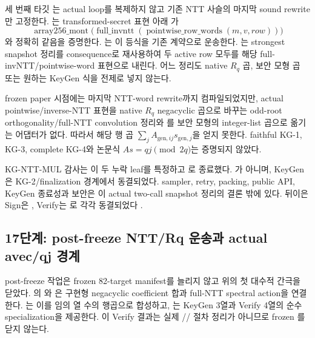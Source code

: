 세 번째 타깃 는 actual loop를 복제하지
않고 기존 NTT 사슬의 마지막 sound rewrite만 고정한다.
는 transformed-secret 표현 아래
가
\[
  \operatorname{array256\_mont}
  \bigl(\operatorname{full\_invntt}
    (\operatorname{pointwise\_row\_words}(m,v,row))\bigr)
\]
와 정확히 같음을 증명한다.
는 이 등식을 기존
 계약으로 운송한다.
는 strongest snapshot
정리를 consequence로 재사용하여 두 active row 모두를 해당
full-invNTT/pointwise-word 표현으로 내린다. 어느 정리도 native \(R_q\) 곱,
보안 모형 곱 또는 원하는 KeyGen 식을 전제로 넣지 않는다.

\begin{openobligation}
frozen paper 시점에는 마지막 NTT-word rewrite까지 컴파일되었지만, actual pointwise/inverse-NTT
표현을 native \(R_q\) negacyclic 곱으로 바꾸는 odd-root orthogonality/full-NTT
convolution 정리와 를 보안 모형의 integer-list 곱으로 옮기는
어댑터가 없다. 따라서 해당 행 곱
\(\sum_j A_{\mathrm{gen},ij}s_{\mathrm{gen},j}\)을 얻지 못한다. faithful KG-1,
KG-3, complete KG-4와 논문식 \(A s=qj\pmod{2q}\)는 증명되지 않았다.
\end{openobligation}

KG-NTT-MUL 감사는 이 두 누락 leaf를 특정하고
로 종료했다.
가 아니며, KeyGen은 KG-2/finalization 경계에서 동결되었다.
sampler, retry, packing, public API, KeyGen 종료성과 보안은 이 actual two-call
snapshot 정리의 결론 밖에 있다. 뒤이은 Sign은
, Verify는
로 각각 동결되었다
\cite{week16-sign-report,week16-verify-report,paper-freeze-artifacts}.

\subsection{17단계: post-freeze NTT/Rq 운송과 actual avec/qj 경계}

post-freeze 작업은 frozen 82-target manifest를 늘리지 않고 위의 첫 대수적
간극을 닫았다. 의
와
은 구현형 negacyclic coefficient
합과 full-NTT spectral action을 연결한다.
는 이를 임의 열 수의 행곱으로
합성하고, 는 KeyGen 3열과 Verify 4열의
순수 specialization을 제공한다. 이 Verify 결과는 실제
//
 절차 정리가 아니므로 frozen
를 닫지 않는다.

